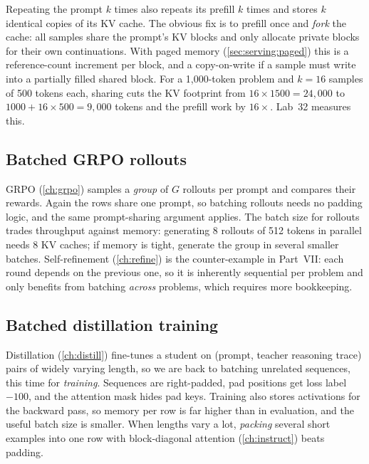 \begin{systemslens}
Repeating the prompt $k$ times also repeats its prefill $k$ times and stores $k$ identical copies of
its KV cache. The obvious fix is to prefill once and \emph{fork} the cache: all samples share the
prompt's KV blocks and only allocate private blocks for their own continuations. With paged memory
(\cref{sec:serving:paged}) this is a reference-count increment per block, and a copy-on-write if a
sample must write into a partially filled shared block. For a 1,000-token problem and $k=16$
samples of 500 tokens each, sharing cuts the KV footprint from $16\times1500=24{,}000$ to
$1000+16\times500=9{,}000$ tokens and the prefill work by $16\times$. Lab~32 measures this.
\end{systemslens}

\subsection{Batched GRPO rollouts}
GRPO (\cref{ch:grpo}) samples a \emph{group} of $G$ rollouts per prompt and compares their rewards.
Again the rows share one prompt, so batching rollouts needs no padding logic, and the same
prompt-sharing argument applies. The batch size for rollouts trades throughput against memory:
generating 8 rollouts of 512 tokens in parallel needs 8 KV caches; if memory is tight, generate the
group in several smaller batches. Self-refinement (\cref{ch:refine}) is the counter-example in Part~VII:
each round depends on the previous one, so it is inherently sequential per problem and only benefits
from batching \emph{across} problems, which requires more bookkeeping.

\subsection{Batched distillation training}
Distillation (\cref{ch:distill}) fine-tunes a student on (prompt, teacher reasoning trace) pairs of
widely varying length, so we are back to batching unrelated sequences, this time for \emph{training}.
Sequences are right-padded, pad positions get loss label $-100$, and the attention mask hides pad keys.
Training also stores activations for the backward pass, so memory per row is far higher than in
evaluation, and the useful batch size is smaller. When lengths vary a lot, \emph{packing} several
short examples into one row with block-diagonal attention (\cref{ch:instruct}) beats padding.

